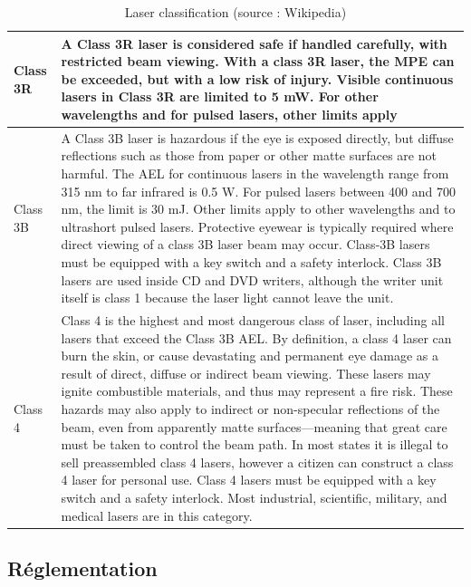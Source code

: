 \begin{appendices}
\begin{en}
\begin{table}
\begin{bigcenter}
\begin{tabular}{|l|p{}|}
\hline
Class 3R & A Class 3R laser is considered safe if handled carefully, with restricted beam viewing. With a class 3R laser, the MPE can be exceeded, but with a low risk of injury. Visible continuous lasers in Class 3R are limited to 5 mW. For other wavelengths and for pulsed lasers, other limits apply \\
\hline
Class 3B & A Class 3B laser is hazardous if the eye is exposed directly, but diffuse reflections such as those from paper or other matte surfaces are not harmful. The AEL for continuous lasers in the wavelength range from 315 nm to far infrared is 0.5 W. For pulsed lasers between 400 and 700 nm, the limit is 30 mJ. Other limits apply to other wavelengths and to ultrashort pulsed lasers. Protective eyewear is typically required where direct viewing of a class 3B laser beam may occur. Class-3B lasers must be equipped with a key switch and a safety interlock. Class 3B lasers are used inside CD and DVD writers, although the writer unit itself is class 1 because the laser light cannot leave the unit. \\
\hline
Class 4 & Class 4 is the highest and most dangerous class of laser, including all lasers that exceed the Class 3B AEL. By definition, a class 4 laser can burn the skin, or cause devastating and permanent eye damage as a result of direct, diffuse or indirect beam viewing. These lasers may ignite combustible materials, and thus may represent a fire risk. These hazards may also apply to indirect or non-specular reflections of the beam, even from apparently matte surfaces—meaning that great care must be taken to control the beam path. In most states it is illegal to sell preassembled class 4 lasers, however a citizen can construct a class 4 laser for personal use. Class 4 lasers must be equipped with a key switch and a safety interlock. Most industrial, scientific, military, and medical lasers are in this category. \\
\hline

	\end{tabular}
	\end{bigcenter}
	\caption{\label{tab:laser_classification} Laser classification (source : Wikipedia)}
\end{table}	
\end{en}
\restoregeometry{}


\begin{fr}
\subsection*{Réglementation}


\end{fr}
\end{appendices}
